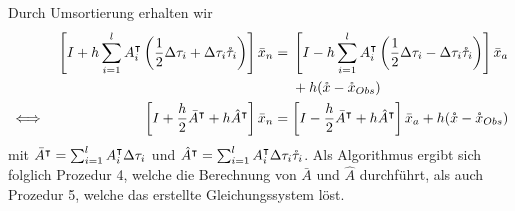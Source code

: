 Durch Umsortierung erhalten wir
\begin{equation}
\label{eq:genMidpointAdjoint}
\begin{aligned}
&& \left[I +h\sum_{i=1}^l A_i^\intercal \left(\frac{1}{2} \Delta \tau_i +\Delta \tau_i \mathring{\tau}_i\right) \right]\bar{x}_n &= 
\begin{aligned}[t]
&\left[I - h\sum_{i=1}^l A_i^\intercal  \left(\frac{1}{2}\Delta \tau_i-\Delta \tau_i \mathring{\tau}_i\right)\right]\bar{x}_a \\
& +h (\mathring{x} -\mathring{x}_{Obs})
\end{aligned}\\
\iff&& \left[I +\frac{h}{2} \bar{A}^\intercal +h\hat{A}^\intercal\right]\bar{x}_n &= \left[I - \frac{h}{2}\bar{A}^\intercal + h\hat{A}^\intercal\right]\bar{x}_a  +h (\mathring{x} -\mathring{x}_{Obs})\\
\end{aligned}
\end{equation}
mit $\bar{A}^\intercal = \sum_{i=1}^l A_i^\intercal \Delta \tau_i $ und $\hat{A}^\intercal = \sum_{i=1}^l A_i^\intercal \Delta \tau_i \mathring{\tau}_i$.
Als Algorithmus ergibt sich folglich Prozedur 4, welche die Berechnung von $\bar A$ und $\hat A$ durchführt, als auch Prozedur 5, welche das erstellte Gleichungssystem löst.
